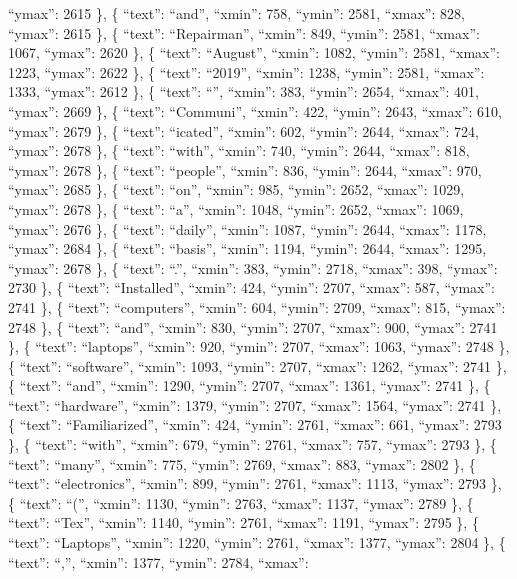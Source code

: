 \documentclass[
]{article}
\begin{document}
``ymax'': 2615 \}, \{ ``text'': ``and'', ``xmin'': 758, ``ymin'': 2581,
``xmax'': 828, ``ymax'': 2615 \}, \{ ``text'': ``Repairman'', ``xmin'':
849, ``ymin'': 2581, ``xmax'': 1067, ``ymax'': 2620 \}, \{ ``text'':
``August'', ``xmin'': 1082, ``ymin'': 2581, ``xmax'': 1223, ``ymax'':
2622 \}, \{ ``text'': ``2019'', ``xmin'': 1238, ``ymin'': 2581,
``xmax'': 1333, ``ymax'': 2612 \}, \{ ``text'': ``\textbar{}'',
``xmin'': 383, ``ymin'': 2654, ``xmax'': 401, ``ymax'': 2669 \}, \{
``text'': ``Communi'', ``xmin'': 422, ``ymin'': 2643, ``xmax'': 610,
``ymax'': 2679 \}, \{ ``text'': ``icated'', ``xmin'': 602, ``ymin'':
2644, ``xmax'': 724, ``ymax'': 2678 \}, \{ ``text'': ``with'', ``xmin'':
740, ``ymin'': 2644, ``xmax'': 818, ``ymax'': 2678 \}, \{ ``text'':
``people'', ``xmin'': 836, ``ymin'': 2644, ``xmax'': 970, ``ymax'': 2685
\}, \{ ``text'': ``on'', ``xmin'': 985, ``ymin'': 2652, ``xmax'': 1029,
``ymax'': 2678 \}, \{ ``text'': ``a'', ``xmin'': 1048, ``ymin'': 2652,
``xmax'': 1069, ``ymax'': 2676 \}, \{ ``text'': ``daily'', ``xmin'':
1087, ``ymin'': 2644, ``xmax'': 1178, ``ymax'': 2684 \}, \{ ``text'':
``basis'', ``xmin'': 1194, ``ymin'': 2644, ``xmax'': 1295, ``ymax'':
2678 \}, \{ ``text'': ``.'', ``xmin'': 383, ``ymin'': 2718, ``xmax'':
398, ``ymax'': 2730 \}, \{ ``text'': ``Installed'', ``xmin'': 424,
``ymin'': 2707, ``xmax'': 587, ``ymax'': 2741 \}, \{ ``text'':
``computers'', ``xmin'': 604, ``ymin'': 2709, ``xmax'': 815, ``ymax'':
2748 \}, \{ ``text'': ``and'', ``xmin'': 830, ``ymin'': 2707, ``xmax'':
900, ``ymax'': 2741 \}, \{ ``text'': ``laptops'', ``xmin'': 920,
``ymin'': 2707, ``xmax'': 1063, ``ymax'': 2748 \}, \{ ``text'':
``software'', ``xmin'': 1093, ``ymin'': 2707, ``xmax'': 1262, ``ymax'':
2741 \}, \{ ``text'': ``and'', ``xmin'': 1290, ``ymin'': 2707, ``xmax'':
1361, ``ymax'': 2741 \}, \{ ``text'': ``hardware'', ``xmin'': 1379,
``ymin'': 2707, ``xmax'': 1564, ``ymax'': 2741 \}, \{ ``text'':
``Familiarized'', ``xmin'': 424, ``ymin'': 2761, ``xmax'': 661,
``ymax'': 2793 \}, \{ ``text'': ``with'', ``xmin'': 679, ``ymin'': 2761,
``xmax'': 757, ``ymax'': 2793 \}, \{ ``text'': ``many'', ``xmin'': 775,
``ymin'': 2769, ``xmax'': 883, ``ymax'': 2802 \}, \{ ``text'':
``electronics'', ``xmin'': 899, ``ymin'': 2761, ``xmax'': 1113,
``ymax'': 2793 \}, \{ ``text'': ``('', ``xmin'': 1130, ``ymin'': 2763,
``xmax'': 1137, ``ymax'': 2789 \}, \{ ``text'': ``Tex'', ``xmin'': 1140,
``ymin'': 2761, ``xmax'': 1191, ``ymax'': 2795 \}, \{ ``text'':
``Laptops'', ``xmin'': 1220, ``ymin'': 2761, ``xmax'': 1377, ``ymax'':
2804 \}, \{ ``text'': ``,'', ``xmin'': 1377, ``ymin'': 2784, ``xmax'':
\end{document}
